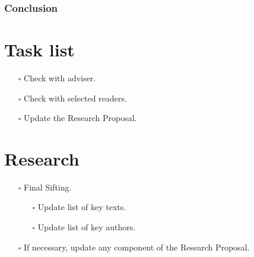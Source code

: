 \documentclass[paper=A4,portrait,twoside=true,twocolumn=true,headinclude=false,footinclude=false,fontsize=10,BCOR=15mm,DIV=13,pagesize=auto,titlepage=firstiscover,mpinclude=true,open=right,chapterprefix=true,numbers=autoendperiod,headsepline=false,parskip=false]{scrbook}
\theoremstyle{definition}
\begin{document}
\subsection{Conclusion}
\label{sec:org098cd12}
\chapter{Task list}
\label{sec:orgf630b15}
\begin{itemize}
\item[{$\square$}] Check with adviser.
\item[{$\square$}] Check with selected readers.
\item[{$\square$}] Update the Research Proposal.
\end{itemize}
\chapter{Research}
\label{sec:orgdf8a695}
\begin{itemize}
\item[{$\square$}] Final Sifting.
\begin{itemize}
\item[{$\square$}] Update list of key texts.
\item[{$\square$}] Update list of key authors.
\end{itemize}
\item[{$\square$}] If necessary, update any component of the Research Proposal.
\end{itemize}
\end{document}
